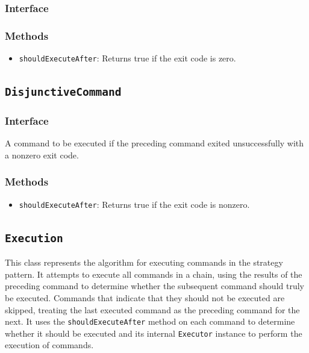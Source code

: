 \documentclass{article}
\begin{document}
  \subsubsection{Interface}
  

  \subsubsection{Methods}
  \begin{itemize}
    \item \texttt{shouldExecuteAfter}: Returns true if the exit code is
      zero.
  \end{itemize}

  \subsection{\texttt{DisjunctiveCommand}}

  \subsubsection{Interface}
  

  A command to be executed if the preceding command exited
  unsuccessfully with a nonzero exit code.

  \subsubsection{Methods}
  \begin{itemize}
    \item \texttt{shouldExecuteAfter}: Returns true if the exit code is
      nonzero.
  \end{itemize}

  \subsection{\texttt{Execution}}

  This class represents the algorithm for executing commands in the
  strategy pattern.  It attempts to execute all commands in a chain,
  using the results of the preceding command to determine whether the
  subsequent command should truly be executed.  Commands that indicate
  that they should not be executed are skipped, treating the last
  executed command as the preceding command for the next.  It uses the
  \texttt{shouldExecuteAfter} method on each command to determine
  whether it should be executed and its internal \texttt{Executor}
  instance to perform the execution of commands.
\end{document}
